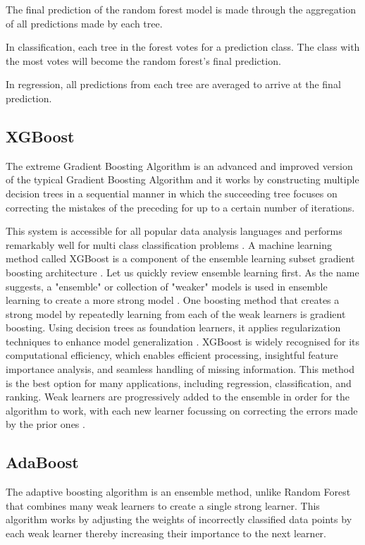 \documentclass[12pt, a4paper,twoside]{report}
\numberwithin{equation}{chapter}
\begin{document}
The final prediction of the random forest model is made through the aggregation of all predictions made by each tree. 

In classification, each tree in the forest votes for a prediction class. The class with the most votes will become the random forest's final prediction.

In regression, all predictions from each tree are averaged to arrive at the final prediction.

\subsection{XGBoost}
The extreme Gradient Boosting Algorithm \parencite{chentianqi} is an advanced and improved version of the typical Gradient Boosting Algorithm and it works by constructing multiple decision trees in a sequential manner in which the succeeding tree focuses on correcting the mistakes of the preceding for up to a certain number of iterations. 

This system is accessible for all popular data analysis languages and performs remarkably well for multi class classification problems \parencite{warnat-herresthal-2021}. A machine learning method called XGBoost is a component of the ensemble learning subset gradient boosting architecture \parencite{mehta-2019}. Let us quickly review ensemble learning first. As the name suggests, a "ensemble" or collection of "weaker" models is used in ensemble learning to create a more strong model \parencite{vilarino-2017}. One boosting method that creates a strong model by repeatedly learning from each of the weak learners is gradient boosting. Using decision trees as foundation learners, it applies regularization techniques to enhance model generalization \parencite{ji-2022}. XGBoost is widely recognised for its computational efficiency, which enables efficient processing, insightful feature importance analysis, and seamless handling of missing information. This method is the best option for many applications, including regression, classification, and ranking. Weak learners are progressively added to the ensemble in order for the algorithm to work, with each new learner focussing on correcting the errors made by the prior ones \parencite{zhang-2019}.


\subsection{AdaBoost}
The adaptive boosting algorithm \parencite{freund1997decision} is an ensemble method, unlike Random Forest that combines many weak learners to create a single strong learner. This algorithm works by adjusting the weights of incorrectly classified data points by each weak learner thereby increasing their importance to the next learner.
\end{document}
